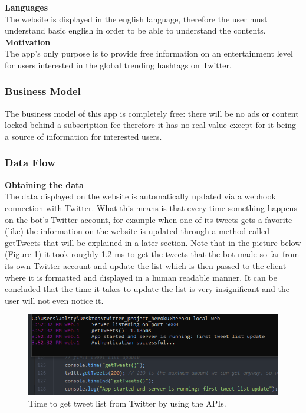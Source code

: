 \documentclass[12pt]{article} %
\begin{document}
\noindent \textbf{Languages}
\\[0.3cm]
The website is displayed in the english language, therefore the user must understand basic english
in order to be able to understand the contents.
\\[0.3cm]
\textbf{Motivation}
\\[0.3cm]
The app's only purpose is to provide free information on an entertainment level for users interested
in the global trending hashtags on Twitter.
 



\subsubsection{Business Model} %

The business model of this app is completely free: there will be no ads or content locked
behind a subscription fee therefore it has no real value except for it being a source of information for interested users.




\subsubsection{Data Flow} %

\textbf{Obtaining the data}
\\[0.3cm]
The data displayed on the website is automatically updated via a webhook connection with Twitter. What this means is that every 
time something happens on the bot's Twitter account, for example when one of its tweets gets a favorite (like)
the information on the website is updated through a method called getTweets that will be explained in a later section.
\newline
Note that in the picture below (Figure 1)  it took roughly 1.2 ms to get 
the tweets that the bot made so far from its own Twitter account and update the list which is then passed to the client where it is formatted and displayed
in a human readable manner.
It can be concluded that the time it takes to update the list is very insignificant and the user will not even notice it.

\begin{figure}[H] %
\includegraphics[width=1\linewidth]{images/getTweetsTime}
\caption{Time to get tweet list from Twitter by using the APIs.}
\label{getTweetsTime}
\end{figure}
\end{document}
